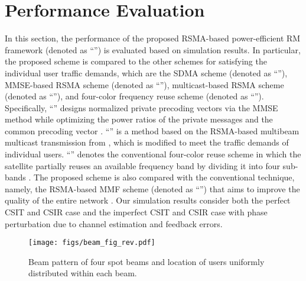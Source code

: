 \documentclass[draftclsnofoot, onecolumn, comsoc, 12pt]{IEEEtran}
\begin{document}
\section{Performance Evaluation}



In this section, the performance of the proposed RSMA-based power-efficient RM framework (denoted as ``{}'') is evaluated based on simulation results.
{ In particular, the proposed scheme is compared to the other schemes for satisfying the individual user traffic demands, which are the SDMA scheme (denoted as ``{}''), MMSE-based RSMA scheme (denoted as ``{}'')\cite{cui2023energy}, multicast-based RSMA scheme (denoted as ``{}'')\cite{10304489}, and four-color frequency reuse scheme (denoted as ``{}'').} 
Specifically, ``{}'' designs normalized private precoding vectors via the MMSE method while optimizing the power ratios of the private messages and the common precoding vector \cite{cui2023energy}. 
{``{}'' is a method based on the RSMA-based multibeam multicast transmission from \cite{10304489}, which is modified to meet the traffic demands of individual users.}
``{}'' denotes the conventional four-color reuse scheme in which the satellite partially reuses an available frequency band by dividing it into four sub-bands \cite{perez2019signal}. The proposed scheme is also compared with the conventional technique, namely, the RSMA-based MMF scheme (denoted as ``{}'') that aims to improve the quality of the entire network \cite{yin2022rate}. 
Our simulation results consider both the perfect CSIT and CSIR case and the imperfect CSIT and CSIR case with phase perturbation due to channel estimation and feedback errors.  
\begin{figure}[!b]
\centering
 		\texttt{[image: figs/beam\_fig\_rev.pdf]}%
 		\caption{{Beam pattern of four spot beams and location of users uniformly distributed within each beam.}}%
    	\label{Fig_beam} 
\end{figure}
\end{document}
